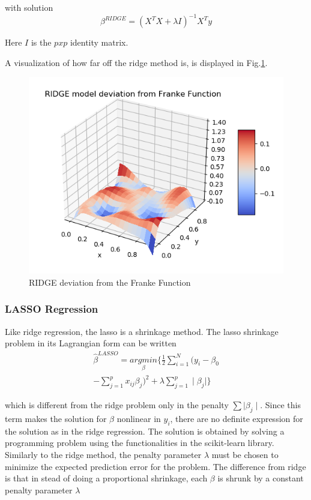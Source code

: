 \documentclass[a4paper,11pt,twocolumn]{article}
\begin{document}
with solution 
\begin{equation}
\beta^{RIDGE}=(X^T X + \lambda I)^{-1} X^T y
\end{equation}

Here $I$ is the $pxp$ identity matrix. 

A visualization of how far off the ridge method is, is displayed in Fig.\ref{ridgedeviation}.
\begin{figure}[h]
\centering
\includegraphics[scale=0.75]{ridgedeviation}
\caption{RIDGE deviation from the Franke Function}
\label{ridgedeviation}
\end{figure}

\subsubsection{LASSO Regression}

Like ridge regression, the lasso is a shrinkage method.
The lasso shrinkage problem in its Lagrangian form can be written 
\begin{equation}
\begin{multlined}
\hat{\beta}^{LASSO}=\underset{\beta}{argmin}\lbrace\frac{1}{2}\sum\limits_{i=1}^N(y_i-\beta_0\\-\sum\limits_{j=1}^px_{ij}\beta_j)^2+\lambda\sum\limits_{j=1}^p\mid\beta_j\mid\rbrace
\end{multlined}
\end{equation}

which is different from the ridge problem only in the penalty $\sum\mid\beta_j\mid$. Since this term makes the solution for $\beta$ nonlinear in $y_i$, there are no definite expression for the solution as in the ridge regression. The solution is obtained by solving a programming problem using the functionalities in the scikit-learn library. Similarly to the ridge method, the penalty parameter $\lambda$ must be chosen to minimize the expected prediction error for the problem. The difference from ridge is that in stead of doing a proportional shrinkage, each $\beta$ is shrunk by a constant penalty parameter $\lambda$\cite{Hastie} 
\end{document}
